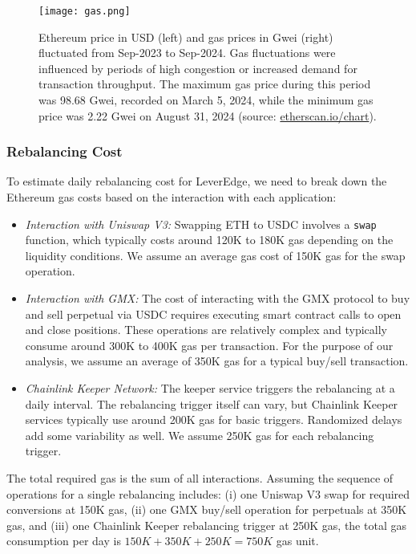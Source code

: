 \begin{figure}[t]
	\texttt{[image: gas.png]}
	\caption[Ethereum price and gas fluctuations]{Ethereum price in USD (left) and gas prices in Gwei (right) fluctuated from Sep-2023 to Sep-2024. Gas fluctuations were influenced by periods of high congestion or increased demand for transaction throughput. The maximum gas price during this period was 98.68 Gwei, recorded on March 5, 2024, while the minimum gas price was 2.22 Gwei on August 31, 2024 (source: \url{etherscan.io/chart}).}
	\label{fig:gas}
\end{figure}

\subsubsection{Rebalancing Cost}
To estimate daily rebalancing cost for LeverEdge, we need to break down the Ethereum gas costs based on the interaction with each application:
\begin{itemize}[leftmargin=*] 
	\item \textit{Interaction with Uniswap V3:} Swapping ETH to USDC involves a \texttt{swap} function, which typically costs around 120K to 180K gas depending on the liquidity conditions. We assume an average gas cost of 150K gas for the swap operation.
	
	\item \textit{Interaction with GMX:} The cost of interacting with the GMX protocol to buy and sell perpetual via USDC requires executing smart contract calls to open and close positions. These operations are relatively complex and typically consume around 300K to 400K gas per transaction. For the purpose of our analysis, we assume an average of 350K gas for a typical buy/sell transaction.
	
	\item \textit{Chainlink Keeper Network:} The keeper service triggers the rebalancing at a daily interval. The rebalancing trigger itself can vary, but Chainlink Keeper services typically use around 200K gas for basic triggers. Randomized delays add some variability as well. We assume 250K gas for each rebalancing trigger.
\end{itemize}
The total required gas is the sum of all interactions. Assuming the sequence of operations for a single rebalancing includes: (i) one Uniswap V3 swap for required conversions at 150K gas, (ii) one GMX buy/sell operation for perpetuals at 350K gas, and (iii) one Chainlink Keeper rebalancing trigger at 250K gas, the total gas consumption per day is \(150K + 350K + 250K = 750K\) gas unit. 

